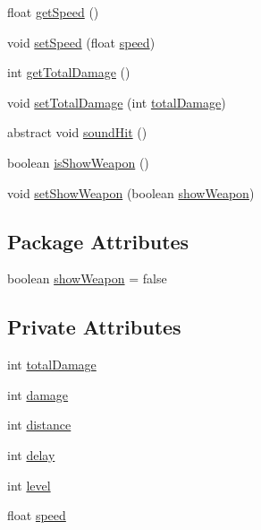 \begin{DoxyCompactItemize}
\item 
float \mbox{\hyperlink{classitems_1_1weapons_1_1_weapon_a013867f8af2ed54e6ed35abaa8a2b6c0}{get\+Speed}} ()
\item 
void \mbox{\hyperlink{classitems_1_1weapons_1_1_weapon_a5e46a5b3555de5a67d259546156928e3}{set\+Speed}} (float \mbox{\hyperlink{classitems_1_1weapons_1_1_weapon_ac653ddf600cd6add7078dc32b5f1584a}{speed}})
\item 
int \mbox{\hyperlink{classitems_1_1weapons_1_1_weapon_a1df8f67e5cd632d225f5419b636507a4}{get\+Total\+Damage}} ()
\item 
void \mbox{\hyperlink{classitems_1_1weapons_1_1_weapon_a8fda5273650d7a1b2be0e8ea8ce1d733}{set\+Total\+Damage}} (int \mbox{\hyperlink{classitems_1_1weapons_1_1_weapon_afce1cb3b61716a4880f125ac3bd2856b}{total\+Damage}})
\item 
abstract void \mbox{\hyperlink{classitems_1_1weapons_1_1_weapon_a8a51848ed533654361356bf83697cedb}{sound\+Hit}} ()
\item 
boolean \mbox{\hyperlink{classitems_1_1weapons_1_1_weapon_a923a0d192521b8392932a07c89cb1c92}{is\+Show\+Weapon}} ()
\item 
void \mbox{\hyperlink{classitems_1_1weapons_1_1_weapon_ac7a2a2577ee56bd6646dbae61beae819}{set\+Show\+Weapon}} (boolean \mbox{\hyperlink{classitems_1_1weapons_1_1_weapon_a10d11b88c4ef35bf42543658c6d7e675}{show\+Weapon}})
\end{DoxyCompactItemize}
\subsection*{Package Attributes}
\begin{DoxyCompactItemize}
\item 
boolean \mbox{\hyperlink{classitems_1_1weapons_1_1_weapon_a10d11b88c4ef35bf42543658c6d7e675}{show\+Weapon}} = false
\end{DoxyCompactItemize}
\subsection*{Private Attributes}
\begin{DoxyCompactItemize}
\item 
int \mbox{\hyperlink{classitems_1_1weapons_1_1_weapon_afce1cb3b61716a4880f125ac3bd2856b}{total\+Damage}}
\item 
int \mbox{\hyperlink{classitems_1_1weapons_1_1_weapon_aa84d0aca66daedb3adb9209b6f2846a3}{damage}}
\item 
int \mbox{\hyperlink{classitems_1_1weapons_1_1_weapon_a125dc77704bbb1758d35f282802dcb8d}{distance}}
\item 
int \mbox{\hyperlink{classitems_1_1weapons_1_1_weapon_acf51fcf734c1ce98cbc6d1c2912e8058}{delay}}
\item 
int \mbox{\hyperlink{classitems_1_1weapons_1_1_weapon_ae66ceb47ad12380ee5d39960606980b3}{level}}
\item 
float \mbox{\hyperlink{classitems_1_1weapons_1_1_weapon_ac653ddf600cd6add7078dc32b5f1584a}{speed}}
\end{DoxyCompactItemize}


